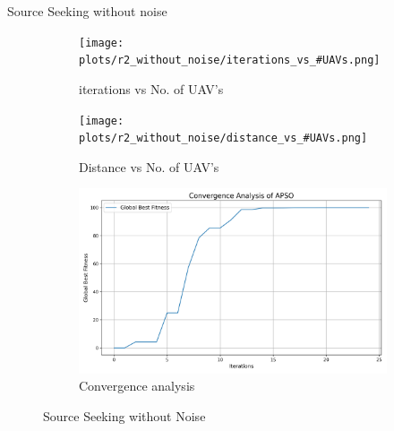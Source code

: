 \documentclass[aspectratio=169]{beamer}
\begin{document}
\begin{frame}{Source Seeking without noise}    
    \begin{figure}[h]
        \centering
        \begin{subfigure}[b]{0.32\textwidth}
            \centering
            \texttt{[image: plots/r2\_without\_noise/iterations\_vs\_\#UAVs.png]}
            \caption{iterations vs No. of UAV's}
        \end{subfigure}
        \hfill
        \begin{subfigure}[b]{0.32\textwidth}
            \centering
            \texttt{[image: plots/r2\_without\_noise/distance\_vs\_\#UAVs.png]}
            \caption{Distance vs No. of UAV's}
        \end{subfigure}
        \hfill
        \begin{subfigure}[b]{0.32\textwidth}
            \centering
            \includegraphics[width=\textwidth]{plots/r2_without_noise/convergence_analysis.png}
            \caption{Convergence analysis}
        \end{subfigure}
        \caption{Source Seeking without Noise}
    \end{figure}
\end{frame}
\end{document}
